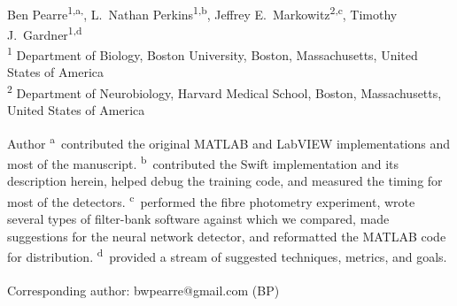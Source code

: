 \documentclass[10pt,letterpaper]{article}
\date{}
\begin{document}
\vspace*{0.35in}

\begin{flushleft}
{\Large
\textbf{}
}
\newline
\\
Ben Pearre\textsuperscript{1,a,\textcurrency},
L.~Nathan Perkins\textsuperscript{1,b},
Jeffrey E.~Markowitz\textsuperscript{2,c},
Timothy J.~Gardner\textsuperscript{1,d}
\\
\bigskip
\textsuperscript{1} Department of Biology, Boston University, Boston, Massachusetts, United States of America\\
\textsuperscript{2} Department of Neurobiology, Harvard Medical School, Boston, Massachusetts, United States of America
\\
\bigskip

% 
%
Author \textsuperscript{a}~contributed the original MATLAB and LabVIEW implementations and most of the manuscript.
\textsuperscript{b}~contributed the Swift implementation and its description herein, helped debug the training code, and measured the timing for most of the detectors.
\textsuperscript{c}~performed the fibre photometry experiment, wrote several types of filter-bank software against which we compared, made suggestions for the neural network detector, and reformatted the MATLAB code for distribution.
\textsuperscript{d}~provided a stream of suggested techniques, metrics, and goals.





\textsuperscript{\textcurrency} Corresponding author: bwpearre@gmail.com (BP)

\end{flushleft}
\end{document}
